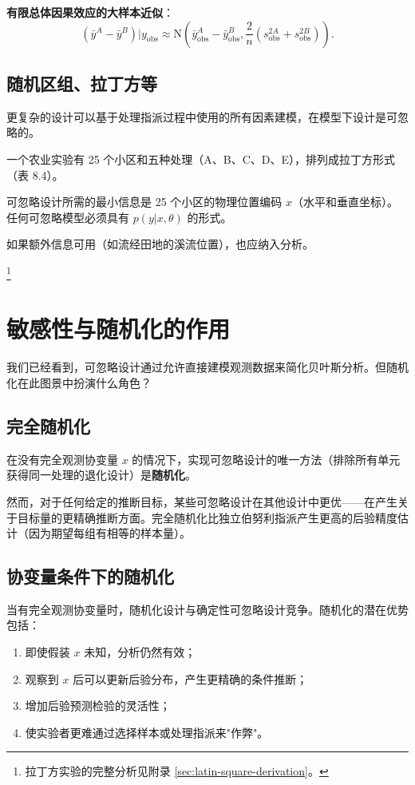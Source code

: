 \textbf{有限总体因果效应的大样本近似}：
\begin{equation}
(\bar{y}^A - \bar{y}^B)|y_{\mathrm{obs}} \approx \mathrm{N}\left(\bar{y}_{\mathrm{obs}}^A - \bar{y}_{\mathrm{obs}}^B, \frac{2}{n}(s_{\mathrm{obs}}^{2A} + s_{\mathrm{obs}}^{2B})\right). \label{eq:ch8-causal-effect-approx}
\end{equation}

\subsection{随机区组、拉丁方等}

更复杂的设计可以基于处理指派过程中使用的所有因素建模，在模型下设计是可忽略的。

\begin{Example}[拉丁方实验]
  一个农业实验有 25 个小区和五种处理（A、B、C、D、E），排列成拉丁方形式（表 8.4）。

  可忽略设计所需的最小信息是 25 个小区的物理位置编码 $x$（水平和垂直坐标）。任何可忽略模型必须具有 $p(y|x,\theta)$ 的形式。

  如果额外信息可用（如流经田地的溪流位置），也应纳入分析。
\end{Example}\footnote{拉丁方实验的完整分析见附录 \cref{sec:latin-square-derivation}。}

\section{敏感性与随机化的作用}

我们已经看到，可忽略设计通过允许直接建模观测数据来简化贝叶斯分析。但随机化在此图景中扮演什么角色？

\subsection{完全随机化}

在没有完全观测协变量 $x$ 的情况下，实现可忽略设计的唯一方法（排除所有单元获得同一处理的退化设计）是\textbf{随机化}。

然而，对于任何给定的推断目标，某些可忽略设计在其他设计中更优——在产生关于目标量的更精确推断方面。完全随机化比独立伯努利指派产生更高的后验精度估计（因为期望每组有相等的样本量）。

\subsection{协变量条件下的随机化}

当有完全观测协变量时，随机化设计与确定性可忽略设计竞争。随机化的潜在优势包括：
\begin{enumerate}
  \item 即使假装 $x$ 未知，分析仍然有效；
  \item 观察到 $x$ 后可以更新后验分布，产生更精确的条件推断；
  \item 增加后验预测检验的灵活性；
  \item 使实验者更难通过选择样本或处理指派来"作弊"。
\end{enumerate}

